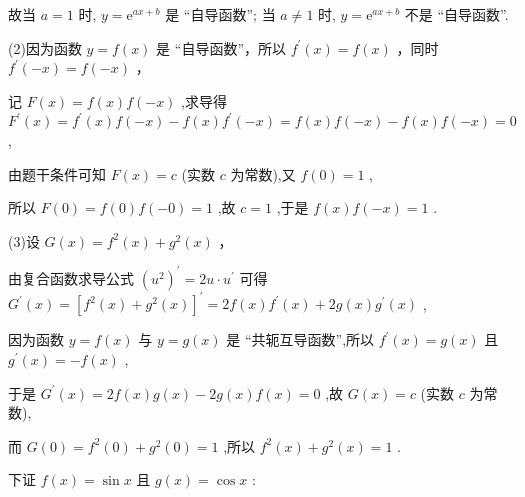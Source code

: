 \documentclass[10pt]{article}
\begin{document}
故当 \(a = 1\) 时, \(y = {\mathrm{e}}^{{ax} + b}\) 是 “自导函数”; 当 \(a \neq  1\) 时, \(y = {\mathrm{e}}^{{ax} + b}\) 不是 “自导函数”.

\hspace*{13em} (2)因为函数 \(y = f\left( x\right)\) 是 “自导函数”，所以 \({f}^{\prime }\left( x\right)  = f\left( x\right)\) ，同时 \({f}^{\prime }\left( {-x}\right)  = f\left( {-x}\right)\) ，

记 \(F\left( x\right)  = f\left( x\right) f\left( {-x}\right)\) ,求导得 \({F}^{\prime }\left( x\right)  = {f}^{\prime }\left( x\right) f\left( {-x}\right)  - f\left( x\right) {f}^{\prime }\left( {-x}\right)  = f\left( x\right) f\left( {-x}\right)  - f\left( x\right) f\left( {-x}\right)  = 0\) ,

\hspace*{1em} 由题干条件可知 \(F\left( x\right)  = c\) (实数 \(c\) 为常数),又 \(f\left( 0\right)  = 1\) ,

\hspace*{1em} 所以 \(F\left( 0\right)  = f\left( 0\right) f\left( {-0}\right)  = 1\) ,故 \(c = 1\) ,于是 \(f\left( x\right) f\left( {-x}\right)  = 1\) .

\hspace*{15em} (3)设 \(G\left( x\right)  = {f}^{2}\left( x\right)  + {g}^{2}\left( x\right)\) ，

\hspace*{2em} 由复合函数求导公式 \({\left( {u}^{2}\right) }^{\prime } = {2u} \cdot  {u}^{\prime }\) 可得 \({G}^{\prime }\left( x\right)  = {\left\lbrack  {f}^{2}\left( x\right)  + {g}^{2}\left( x\right) \right\rbrack  }^{\prime } = {2f}\left( x\right) {f}^{\prime }\left( x\right)  + {2g}\left( x\right) {g}^{\prime }\left( x\right)\) ,

\hspace*{1em} 因为函数 \(y = f\left( x\right)\) 与 \(y = g\left( x\right)\) 是 “共轭互导函数”,所以 \({f}^{\prime }\left( x\right)  = g\left( x\right)\) 且 \({g}^{\prime }\left( x\right)  =  - f\left( x\right)\) ,

\hspace*{1em} 于是 \({G}^{\prime }\left( x\right)  = {2f}\left( x\right) g\left( x\right)  - {2g}\left( x\right) f\left( x\right)  = 0\) ,故 \(G\left( x\right)  = c\) (实数 \(c\) 为常数),

而 \(G\left( 0\right)  = {f}^{2}\left( 0\right)  + {g}^{2}\left( 0\right)  = 1\) ,所以 \({f}^{2}\left( x\right)  + {g}^{2}\left( x\right)  = 1\) .

下证 \(f\left( x\right)  = \sin x\) 且 \(g\left( x\right)  = \cos x\) :
\end{document}
